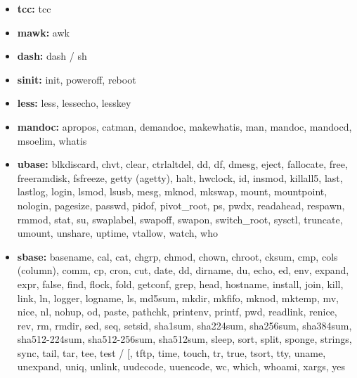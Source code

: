 \begin{itemize}
    \item \textbf{tcc:} tcc
    \item \textbf{mawk:} awk
    \item \textbf{dash:} dash / sh 
    \item \textbf{sinit:} init, poweroff, reboot
    \item \textbf{less:} less, lessecho, lesskey
    \item \textbf{mandoc:} apropos, catman, demandoc, makewhatis, man, mandoc, mandocd, msoelim, whatis
    \item \textbf{ubase:} blkdiscard, chvt, clear, ctrlaltdel, dd, df, dmesg, eject, fallocate, free, freeramdisk, fsfreeze, getty (agetty), halt, hwclock, id, insmod, killall5, last, lastlog, login, lsmod, lsusb, mesg, mknod, mkswap, mount, mountpoint, nologin, pagesize, passwd, pidof, pivot\_root, ps, pwdx, readahead, respawn, rmmod, stat, su, swaplabel, swapoff, swapon, switch\_root, sysctl, truncate, umount, unshare, uptime, vtallow, watch, who
    \item \textbf{sbase:} basename, cal, cat, chgrp, chmod, chown, chroot, cksum, cmp, cols (column), comm, cp, cron, cut, date, dd, dirname, du, echo, ed, env, expand, expr, false, find, flock, fold, getconf, grep, head, hostname, install, join, kill, link, ln, logger, logname, ls, md5sum, mkdir, mkfifo, mknod, mktemp, mv, nice, nl, nohup, od, paste, pathchk, printenv, printf, pwd, readlink, renice, rev, rm, rmdir, sed, seq, setsid, sha1sum, sha224sum, sha256sum, sha384sum, sha512-224sum, sha512-256sum, sha512sum, sleep, sort, split, sponge, strings, sync, tail, tar, tee, test / [, tftp, time, touch, tr, true, tsort, tty, uname, unexpand, uniq, unlink, uudecode, uuencode, wc, which, whoami, xargs, yes
\end{itemize}
